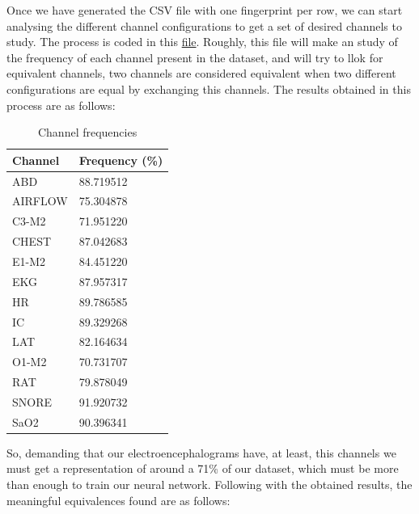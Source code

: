 Once we have generated the CSV file with one fingerprint per row, we can start analysing the different channel configurations to get a set of desired channels to study. The process is coded in this \href{https://github.com/szz-dvl/soundless/blob/main/channels.py}{file}. Roughly, this file will make an study of the frequency of each channel present in the dataset, and will try to llok for equivalent channels, two channels are considered equivalent when two different configurations are equal by exchanging this channels. The results obtained in this process are as follows:

\begin{table}[!h]
\begin{center}
\begin{tabular}{ |p{3cm}||p{3cm}| }
 \hline
 Channel & Frequency (\%)\\
 \hline
 ABD & 88.719512 \\ 
 AIRFLOW & 75.304878 \\  
 C3-M2 & 71.951220 \\
 CHEST & 87.042683 \\
 E1-M2 & 84.451220 \\
 EKG & 87.957317 \\
 HR & 89.786585 \\
 IC & 89.329268 \\
 LAT & 82.164634 \\
 O1-M2 & 70.731707 \\
 RAT & 79.878049 \\
 SNORE & 91.920732 \\
 SaO2 & 90.396341 \\
 \hline
\end{tabular}
\end{center}
\caption{Channel frequencies}
\label{tab1}
\end{table}

So, demanding that our electroencephalograms have, at least, this channels we must get a representation of around a 71\% of our dataset, which must be more than enough to train our neural network. Following with the obtained results, the meaningful equivalences found are as follows:

